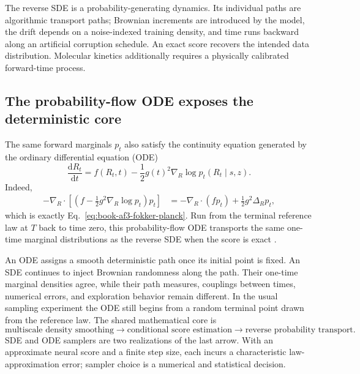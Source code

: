 The reverse SDE is a probability-generating dynamics.  Its individual paths are algorithmic
transport paths; Brownian increments are introduced by the model, the drift depends on a
noise-indexed training density, and time runs backward along an artificial corruption schedule.
An exact score recovers the intended data distribution.  Molecular kinetics additionally requires
a physically calibrated forward-time process.

\subsection{The probability-flow ODE exposes the deterministic core}

The same forward marginals $p_t$ also satisfy the continuity equation generated by the ordinary
differential equation (ODE)
\begin{equation}
\frac{\mathrm dR_t}{\mathrm dt}
=f(R_t,t)-\frac12g(t)^2\nabla_R\log p_t(R_t\mid s,z).
\label{eq:book-af3-probability-flow-ode}
\end{equation}
Indeed,
\begin{align}
-\nabla_R\!\cdot\!\left[
\left(f-\frac12g^2\nabla_R\log p_t\right)p_t
\right]
&=-\nabla_R\!\cdot(fp_t)+\frac12g^2\Delta_Rp_t,
\label{eq:book-af3-ode-continuity}
\end{align}
which is exactly Eq.~\ref{eq:book-af3-fokker-planck}.  Run from the terminal reference law at $T$
back to time zero, this probability-flow ODE transports the same one-time marginal distributions
as the reverse SDE when the score is exact \cite{song2021}.

An ODE assigns a smooth deterministic path once its initial point is fixed.  An SDE continues to
inject Brownian randomness along the path.  Their one-time marginal densities agree, while their
path measures, couplings between times, numerical errors, and exploration behavior remain different.
In the usual sampling experiment the ODE still begins from a random terminal point drawn from the
reference law.  The shared mathematical core is
\begin{equation}
\boxed{
\text{multiscale density smoothing}
\longrightarrow
\text{conditional score estimation}
\longrightarrow
\text{reverse probability transport}.}
\label{eq:book-af3-diffusion-core-appendix}
\end{equation}
SDE and ODE samplers are two realizations of the last arrow.  With an approximate neural score and
a finite step size, each incurs a characteristic law-approximation error; sampler choice is a
numerical and statistical decision.

